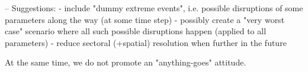 \documentclass{article}
\begin{document}
\begin{refsection}
--
Suggestions:
- include "dummy extreme events", i.e. possible disruptions of some parameters along the way (at some time step)
- possibly create a "very worst case" scenario where all such possible disruptions happen (applied to all parameters)
- reduce sectoral (+spatial) resolution when further in the future

At the same time, we do not promote an "anything-goes" attitude. 





\end{refsection}
\end{document}
